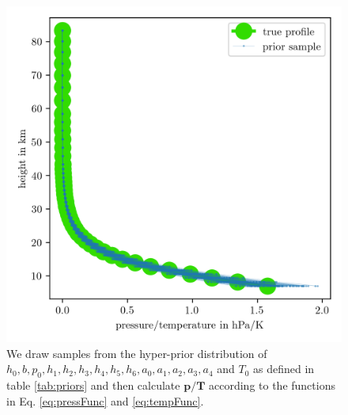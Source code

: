 \begin{figure}[ht!]
	\centering
	\includegraphics{PriorTempOverPostMeanSigm.png}
	\caption[Prior Samples of $\bm{p}/\bm{T}$ according to the respective hyper-prior distribution.]{We draw samples from the hyper-prior distribution of $h_0, b, p_0, h_1, h_2,h_3,h_4,h_5,h_6, a_0, a_1, a_2,a_3,a_4$ and $T_0$ as defined in table \ref{tab:priors} and then calculate $\bm{p}/\bm{T}$ according to the functions in Eq. \ref{eq:pressFunc} and \ref{eq:tempFunc}.}
	\label{fig:PriorPressOverTemp}
\end{figure}


